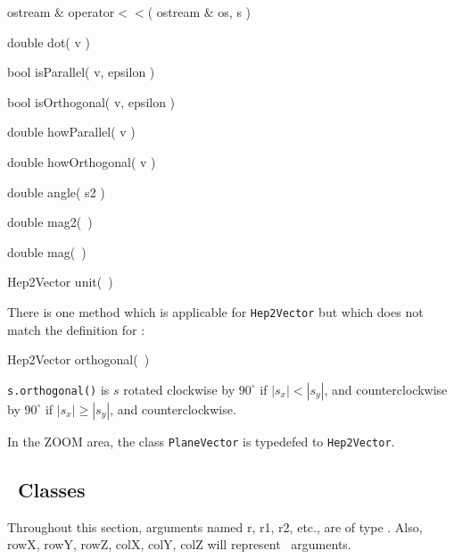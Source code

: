 \begin{shortlist}
  \item ostream \& operator$<<$( ostream \& os, s )
\end{shortlist}
\begin{shortlist}
  \item double dot( v ) \see{\ref{eq:dot}}
  \item bool isParallel( v, epsilon ) \see{\ref{eq:isPar}}
  \item bool isOrthogonal( v, epsilon ) \see{\ref{eq:isOrtho}}
  \item double howParallel( v ) \see{\ref{eq:howPar}, \ref{eq:howPar:2}}
  \item double howOrthogonal( v ) \see{\ref{eq:howOrtho}, \ref{eq:howOrtho:2}}
  \item double angle( s2 ) \see{\ref{eq:angle}}
\end{shortlist}

\begin{shortlist}
  \item double mag2(~) \see{\ref{eq:mag2}}
  \item double mag(~) \see{\ref{eq:mag}, \ref{eq:mag:2}}
  \item Hep2Vector unit(~) \see{\ref{eq:svunit}}
\end{shortlist}

\noindent
There is one method which is applicable for {\tt Hep2Vector} but which 
does not match the definition for \SV:

\begin{shortlist}
  \item Hep2Vector orthogonal(~) 
\end{shortlist}

\noindent
\verb$s.orthogonal()$ is $s$ rotated clockwise by $90^\circ$ if 
$|s_x| < |s_y|$, and counterclockwise by $90^\circ$ if 
$|s_x| \geq |s_y|$, and counterclockwise.

\vspace{.16 in}

In the ZOOM area, the class {\tt PlaneVector} is typedefed to 
{\tt Hep2Vector}.

                                   
\subsection{\protect\Ro\ Classes}

Throughout this section, arguments named r, r1, r2, etc., are of type \Ro.
Also, rowX, rowY, rowZ, colX, colY, colZ will represent \SV\ arguments.

